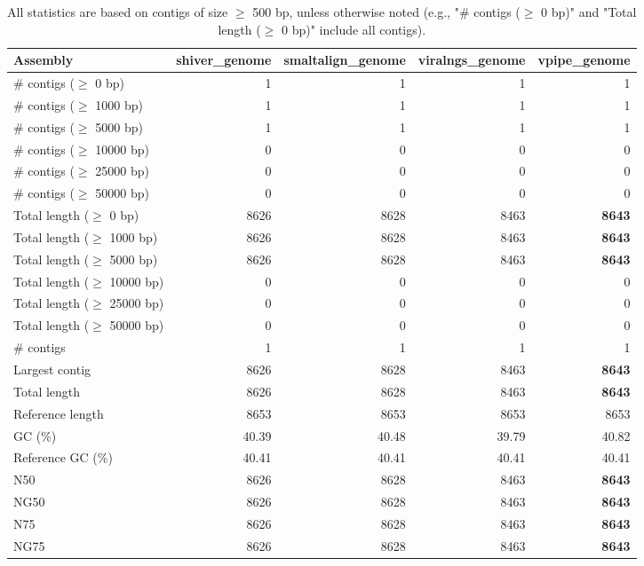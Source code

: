 \documentclass[12pt,a4paper]{article}
\begin{document}
\begin{table}[ht]
\begin{center}
\caption{All statistics are based on contigs of size $\geq$ 500 bp, unless otherwise noted (e.g., "\# contigs ($\geq$ 0 bp)" and "Total length ($\geq$ 0 bp)" include all contigs).}
\begin{tabular}{|l*{4}{|r}|}
\hline
Assembly & shiver\_genome & smaltalign\_genome & viralngs\_genome & vpipe\_genome \\ \hline
\# contigs ($\geq$ 0 bp) & 1 & 1 & 1 & 1 \\ \hline
\# contigs ($\geq$ 1000 bp) & 1 & 1 & 1 & 1 \\ \hline
\# contigs ($\geq$ 5000 bp) & 1 & 1 & 1 & 1 \\ \hline
\# contigs ($\geq$ 10000 bp) & 0 & 0 & 0 & 0 \\ \hline
\# contigs ($\geq$ 25000 bp) & 0 & 0 & 0 & 0 \\ \hline
\# contigs ($\geq$ 50000 bp) & 0 & 0 & 0 & 0 \\ \hline
Total length ($\geq$ 0 bp) & 8626 & 8628 & 8463 & {\bf 8643} \\ \hline
Total length ($\geq$ 1000 bp) & 8626 & 8628 & 8463 & {\bf 8643} \\ \hline
Total length ($\geq$ 5000 bp) & 8626 & 8628 & 8463 & {\bf 8643} \\ \hline
Total length ($\geq$ 10000 bp) & 0 & 0 & 0 & 0 \\ \hline
Total length ($\geq$ 25000 bp) & 0 & 0 & 0 & 0 \\ \hline
Total length ($\geq$ 50000 bp) & 0 & 0 & 0 & 0 \\ \hline
\# contigs & 1 & 1 & 1 & 1 \\ \hline
Largest contig & 8626 & 8628 & 8463 & {\bf 8643} \\ \hline
Total length & 8626 & 8628 & 8463 & {\bf 8643} \\ \hline
Reference length & 8653 & 8653 & 8653 & 8653 \\ \hline
GC (\%) & 40.39 & 40.48 & 39.79 & 40.82 \\ \hline
Reference GC (\%) & 40.41 & 40.41 & 40.41 & 40.41 \\ \hline
N50 & 8626 & 8628 & 8463 & {\bf 8643} \\ \hline
NG50 & 8626 & 8628 & 8463 & {\bf 8643} \\ \hline
N75 & 8626 & 8628 & 8463 & {\bf 8643} \\ \hline
NG75 & 8626 & 8628 & 8463 & {\bf 8643} \\ \hline

\end{tabular}
\end{center}
\end{table}
\end{document}
